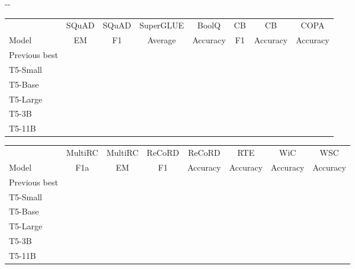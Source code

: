 \documentclass[twoside,11pt]{article}
\newlength{\offsetpage}
\newenvironment{widepage}{\begin{adjustwidth}{-\offsetpage}{-\offsetpage}\addtolength{\textwidth}{2\offsetpage}}{\end{adjustwidth}}
\newcommand{\xa}{\makebox[0pt][l]{}}
\newcommand{\xd}{\makebox[0pt][l]{}}
\begin{document}
\begin{table}
\begin{widepage}
\vspace{0.2em}

\begin{tabular}{l c c c c c c c}
                  & SQuAD       & SQuAD       & SuperGLUE & BoolQ       & CB          & CB        & COPA     \\
    Model         & EM          & F1          & Average   & Accuracy    & F1          & Accuracy  & Accuracy \\
\cmidrule(r){1-1}
\cmidrule(lr){2-3}
\cmidrule(l){4-8}
    Previous best & \xa   & \xa   & \xd  & \xd  & \xd  & \xd  & \xd \\
T5-Small      &      &      &      &      &      &      &      \\
    T5-Base       &      &      &      &      &      &      &      \\
    T5-Large      &      &      &      &      &      &      &      \\
    T5-3B         &      &      &      &      &      &      &      \\
    T5-11B        &  &  &  &  &  &  &  \\
\bottomrule
\end{tabular}

\vspace{0.2em}

\begin{tabular}{l c c c c c c c}
                  & MultiRC     & MultiRC   & ReCoRD     & ReCoRD      & RTE       & WiC        & WSC \\
    Model         & F1a         & EM        & F1         & Accuracy    & Accuracy  & Accuracy   & Accuracy\\
\cmidrule(r){1-1}
\cmidrule(l){2-8}
    Previous best & \xd  & \xd  & \xd  & \xd  & \xd  & \xd  & \xd \\
T5-Small      &      &      &      &      &      &      &      \\
    T5-Base       &      &      &      &      &      &      &      \\
    T5-Large      &      &      &      &      &      &      &      \\
    T5-3B         &      &      &      &      &      &      &      \\
    T5-11B        &  &  &  &  &  &  &  \\
\bottomrule
\end{tabular}

\vspace{0.2em}


\end{widepage}
\end{table}
\end{document}
